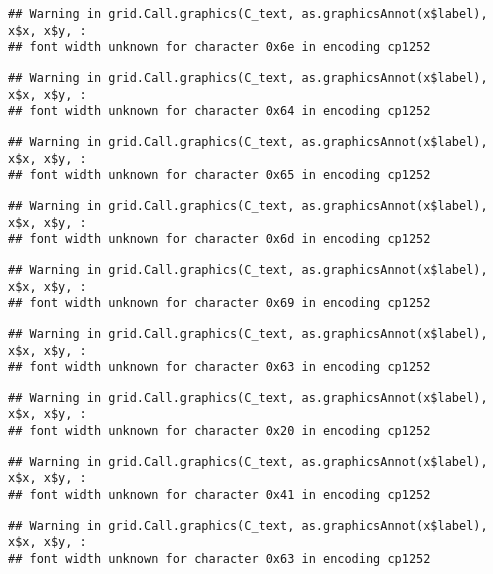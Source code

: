 \documentclass[
]{article}
\begin{document}
\begin{verbatim}
## Warning in grid.Call.graphics(C_text, as.graphicsAnnot(x$label), x$x, x$y, :
## font width unknown for character 0x6e in encoding cp1252
\end{verbatim}

\begin{verbatim}
## Warning in grid.Call.graphics(C_text, as.graphicsAnnot(x$label), x$x, x$y, :
## font width unknown for character 0x64 in encoding cp1252
\end{verbatim}

\begin{verbatim}
## Warning in grid.Call.graphics(C_text, as.graphicsAnnot(x$label), x$x, x$y, :
## font width unknown for character 0x65 in encoding cp1252
\end{verbatim}

\begin{verbatim}
## Warning in grid.Call.graphics(C_text, as.graphicsAnnot(x$label), x$x, x$y, :
## font width unknown for character 0x6d in encoding cp1252
\end{verbatim}

\begin{verbatim}
## Warning in grid.Call.graphics(C_text, as.graphicsAnnot(x$label), x$x, x$y, :
## font width unknown for character 0x69 in encoding cp1252
\end{verbatim}

\begin{verbatim}
## Warning in grid.Call.graphics(C_text, as.graphicsAnnot(x$label), x$x, x$y, :
## font width unknown for character 0x63 in encoding cp1252
\end{verbatim}

\begin{verbatim}
## Warning in grid.Call.graphics(C_text, as.graphicsAnnot(x$label), x$x, x$y, :
## font width unknown for character 0x20 in encoding cp1252
\end{verbatim}

\begin{verbatim}
## Warning in grid.Call.graphics(C_text, as.graphicsAnnot(x$label), x$x, x$y, :
## font width unknown for character 0x41 in encoding cp1252
\end{verbatim}

\begin{verbatim}
## Warning in grid.Call.graphics(C_text, as.graphicsAnnot(x$label), x$x, x$y, :
## font width unknown for character 0x63 in encoding cp1252
\end{verbatim}
\end{document}
